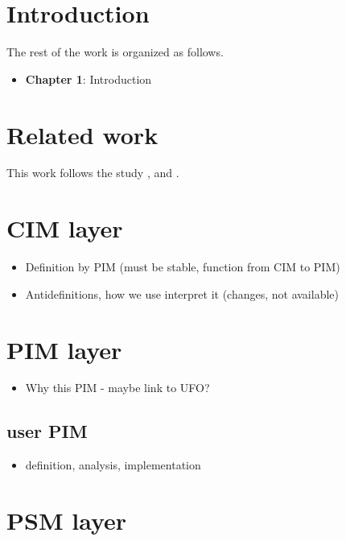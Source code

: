 \chapter*{Introduction}

The rest of the work is organized as follows.

\begin{itemize}
    \item \textbf{Chapter 1}: Introduction
\end{itemize}

\chapter{Related work}

This work follows the study \cite{necasky2012conceptual}, \cite{xcase} and \cite{exolutio}.

\chapter{CIM layer}

\begin{itemize}
    \item Definition by PIM (must be stable, function from CIM to PIM)
    \item Antidefinitions, how we use interpret it (changes, not available)
\end{itemize}

\chapter{PIM layer}

\begin{itemize}
    \item Why this PIM - maybe link to UFO?
\end{itemize}

\section{user PIM}

\begin{itemize}
    \item definition, analysis, implementation
\end{itemize}

\chapter{PSM layer}

